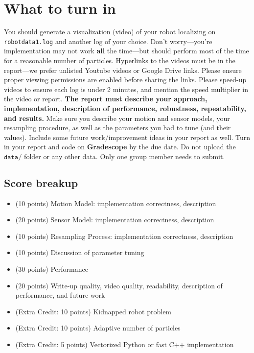 \documentclass[12pt, a4paper]{article}
\begin{document}
\section{What to turn in}

You should generate a visualization (video) of your robot localizing
on \texttt{robotdata1.log} and another log of your choice. Don't
worry---you're implementation may not work \textbf{all }the time---but
should perform most of the time for a reasonable number of particles.
Hyperlinks to the videos must be in the report---we prefer unlisted
Youtube videos or Google Drive links. Please ensure proper viewing
permissions are enabled before sharing the links. Please speed-up
videos to ensure each log is under 2 minutes, and mention the speed
multiplier in the video or report. \textbf{The report must describe
your approach, implementation, description of performance, robustness,
repeatability, and results.} Make sure you describe your motion and
sensor models, your resampling procedure, as well as the parameters
you had to tune (and their values). Include some future work/improvement
ideas in your report as well. Turn in your report\textbf{ }and code
on \textbf{Gradescope} by the due date. Do not upload the $\mathtt{data/}$
folder or any other data. Only one group member needs to submit.

\subsection*{Score breakup}

\begin{itemize}
\item (10 points) Motion Model: implementation correctness, description
\item (20 points) Sensor Model: implementation correctness, description
\item (10 points) Resampling Process: implementation correctness,
description
\item (10 points) Discussion of parameter tuning
\item (30 points) Performance
\item (20 points) Write-up quality, video quality, readability,
description of performance, and future work
\item (Extra Credit: 10 points) Kidnapped robot problem
\item (Extra Credit: 10 points) Adaptive number of particles
\item (Extra Credit: 5 points) Vectorized Python or fast C++ implementation
\end{itemize}
\end{document}
